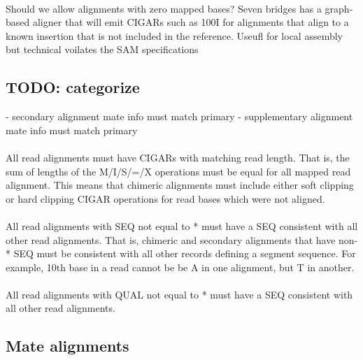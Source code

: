 \documentclass[10pt]{article}
\begin{document}
\paragraph{}

Should we allow alignments with zero mapped bases? Seven bridges has a graph-based aligner that will
emit CIGARs such as 100I for alignments that align to a known insertion that is not included in the reference.
Useufl for local assembly but technical voilates the SAM specifications


\subsection{TODO: categorize}

- secondary alignment mate info must match primary
- supplementary alignment mate info must match primary

\paragraph{}

All read alignments must have CIGARs with matching read length. That is,
the sum of lengths of the M/I/S/=/X operations must be equal for all mapped read alignment.
This means that chimeric alignments must include either soft clipping or
hard clipping CIGAR operations for read bases which were not aligned.

\paragraph{}

All read alignments with SEQ not equal to * must have a SEQ consistent
with all other read alignments. That is, chimeric and secondary alignments that have non-* SEQ
must be consistent with all other records defining a segment sequence. For
example, 10th base in a read cannot be be A in one alignment, but T in another.

\paragraph{}

All read alignments with QUAL not equal to * must have a SEQ consistent
with all other read alignments.

\subsection{Mate alignments}
\end{document}
